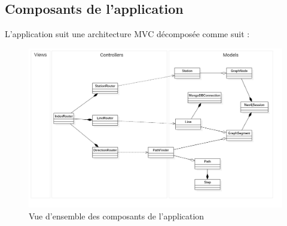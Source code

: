 \subsection{Composants de l'application}
L'application suit une architecture MVC décomposée comme suit :
\begin{figure}
	\includegraphics[width=\textwidth]{img/ClassDiagram.png}
	\caption{Vue d'ensemble des composants de l'application}
	\label{fig:classDiagram}
\end{figure}	
